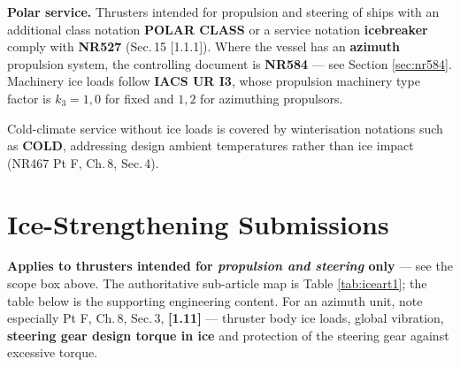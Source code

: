 \documentclass[11pt,a4paper]{report}
\begin{document}
\vspace{2mm}
\noindent\textbf{Polar service.} Thrusters intended for propulsion and steering
of ships with an additional class notation \textbf{POLAR CLASS} or a service
notation \textbf{icebreaker} comply with \textbf{NR527} (Sec.\,15 [1.1.1]).
Where the vessel has an \textbf{azimuth} propulsion system, the controlling
document is \textbf{NR584} --- see Section \ref{sec:nr584}. Machinery ice loads
follow \textbf{IACS UR I3}, whose propulsion machinery type factor is
$k_3 = 1{,}0$ for fixed and $1{,}2$ for azimuthing propulsors.

\vspace{2mm}
\noindent Cold-climate service without ice loads is covered by winterisation
notations such as \textbf{COLD}, addressing design ambient temperatures rather
than ice impact (NR467 Pt F, Ch.\,8, Sec.\,4).

\section{Ice-Strengthening Submissions}

\noindent\textbf{Applies to thrusters intended for \emph{propulsion and
steering} only} --- see the scope box above. The authoritative sub-article map
is Table \ref{tab:iceart1}; the table below is the supporting engineering
content. For an azimuth unit, note especially Pt F, Ch.\,8, Sec.\,3,
\textbf{[1.11]} --- thruster body ice loads, global vibration, \textbf{steering
gear design torque in ice} and protection of the steering gear against
excessive torque.
\end{document}
